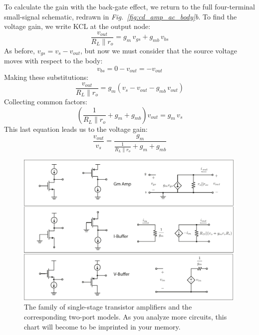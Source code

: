 To calculate the gain with the back-gate effect, we return to the full four-terminal small-signal schematic, redrawn in \emph{Fig.~\ref{fig:cd_amp_ac_body}b}.  To find the voltage gain, we write KCL at the output node: 
    \begin{equation}
        \frac{v_{out}}{R_L \parallel r_o} = g_m\,v_{gs} + g_{mb}\,v_{bs}
    \end{equation}
As before, $v_{gs} = v_{s} - v_{out}$, but now we must consider that the source voltage moves with respect to the body:
    \begin{equation}
        v_{bs} = 0 - v_{out} = -v_{out}
    \end{equation}
Making these substitutions:
    \begin{equation}
        \frac{v_{out}}{R_L \parallel r_o} = g_m\left(v_{s} - v_{out} - g_{mb}\,v_{out}\right)
    \end{equation}
Collecting common factors:
    \begin{equation}
        \left(\frac{1}{R_L \parallel r_o} + g_m + g_{mb}\right)v_{out} = g_m\,v_{s}
    \end{equation}
This last equation leads us to the voltage gain:
    \begin{equation}
        \frac{v_{out}}{v_s} = \frac{g_m}{\frac{1}{R_L \parallel r_o} + g_m + g_{mb}}
    \end{equation}
\begin{figure}[H]
\centering
\includegraphics[width=\columnwidth]{ampchart_models}
\caption{The family of single-stage transistor amplifiers and the corresponding two-port models.  As you analyze more circuits, this chart will become to be imprinted in your memory.}
\label{fig:ampchart_models}
\end{figure}
\newpage
